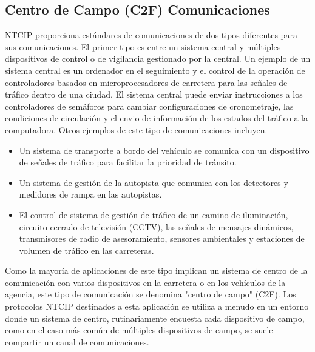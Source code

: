 \subsection{Centro de Campo (C2F) Comunicaciones}
NTCIP proporciona estándares de comunicaciones de dos tipos diferentes para sus comunicaciones. El primer tipo es entre un sistema central y  múltiples dispositivos de control o de vigilancia gestionado por la central. Un ejemplo de un sistema central es un ordenador en el seguimiento  y el control de la operación de controladores basados en microprocesadores de carretera para las señales de tráfico dentro de una ciudad. El sistema central puede enviar instrucciones a los controladores de semáforos para cambiar configuraciones de cronometraje, las condiciones de circulación y el envio de información de  los estados del tráfico a la computadora. Otros ejemplos de este tipo de comunicaciones incluyen.
\begin{itemize}
    \item Un sistema de transporte a bordo del vehículo se comunica con un dispositivo de señales de tráfico para facilitar la prioridad de tránsito.
    \item  Un sistema de gestión de la autopista que comunica con los detectores y medidores de rampa en las autopistas.
    \item El control de sistema de gestión de tráfico de un camino de iluminación, circuito cerrado de televisión (CCTV), las señales de mensajes dinámicos, transmisores de radio de asesoramiento, sensores ambientales y estaciones de volumen de tráfico en las carreteras. 
\end{itemize}
Como la mayoría de aplicaciones de este tipo implican un sistema de centro de la comunicación con varios dispositivos en la carretera o en los  vehículos de la agencia, este tipo de comunicación se denomina "centro de campo" (C2F). Los protocolos NTCIP destinados a esta aplicación se utiliza a menudo en un entorno donde un sistema de centro, rutinariamente encuesta cada dispositivo de campo, como en el caso más común de múltiples dispositivos de campo, se suele compartir un canal de comunicaciones.
